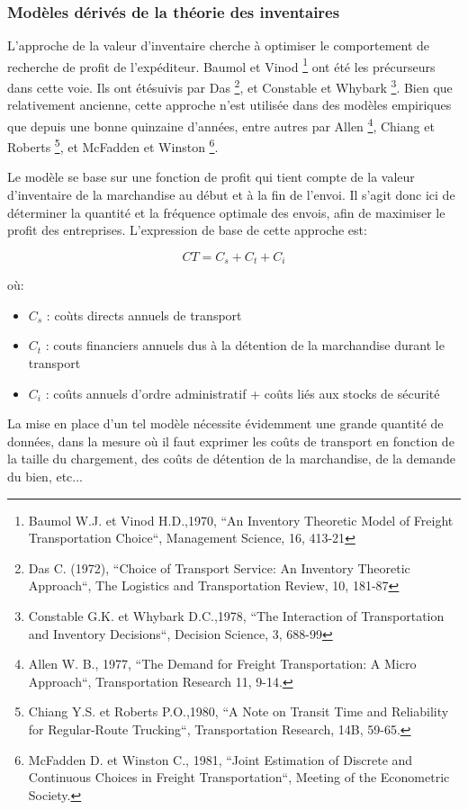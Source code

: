 \subsubsection{Mod\`eles d\'eriv\'es de la th\'eorie des inventaires}


L'approche de la valeur d'inventaire cherche à optimiser le comportement de
recherche de profit de l'expéditeur. Baumol et Vinod \footnote{ Baumol W.J. et
Vinod H.D.,1970, ``An Inventory Theoretic Model of Freight Transportation
Choice``, Management Science, 16, 413-21} ont été les précurseurs dans cette
voie. Ils ont étésuivis par Das \footnote{ Das C. (1972), ``Choice of Transport
Service: An Inventory Theoretic Approach``, The Logistics and Transportation
Review, 10, 181-87}, et Constable et Whybark \footnote{ Constable G.K. et
Whybark D.C.,1978, ``The Interaction of Transportation and Inventory
Decisions``, Decision Science, 3, 688-99}. Bien que relativement ancienne, cette
approche n'est utilisée dans des modèles empiriques que depuis une bonne
quinzaine d'années, entre autres par Allen \footnote{ Allen W. B., 1977, ``The
Demand for Freight Transportation: A Micro Approach``, Transportation Research
11, 9-14.}, Chiang et Roberts
\footnote{Chiang Y.S. et Roberts P.O.,1980, ``A Note on Transit
Time and Reliability for Regular-Route Trucking``, Transportation Research, 14B,
59-65.}, et McFadden et Winston \footnote{McFadden D. et Winston C., 1981,
``Joint Estimation of Discrete and Continuous Choices in Freight
Transportation``, Meeting of the Econometric Society.}.

Le modèle se base sur une fonction de profit qui tient compte de la
valeur d'inventaire de la marchandise au début et à la fin de
l'envoi. Il s'agit donc ici de déterminer la quantité et la
fréquence optimale des envois, afin de maximiser le profit des
entreprises. L'expression de base de cette approche est:

$$CT = C_s + C_t + C_i$$

où:

\begin{itemize}
\item $C_s$ : coùts directs annuels de transport
\item $C_t$ : couts financiers annuels dus à la détention de la marchandise
durant le transport
\item $C_i$ : coûts annuels d'ordre administratif + coûts liés aux stocks de
sécurité\end{itemize}

La mise en place d'un tel modèle nécessite évidemment une grande
quantité de données, dans la mesure où il faut exprimer les coûts
de transport en fonction de la taille du chargement, des coûts de
détention de la marchandise, de la demande du bien, etc...


